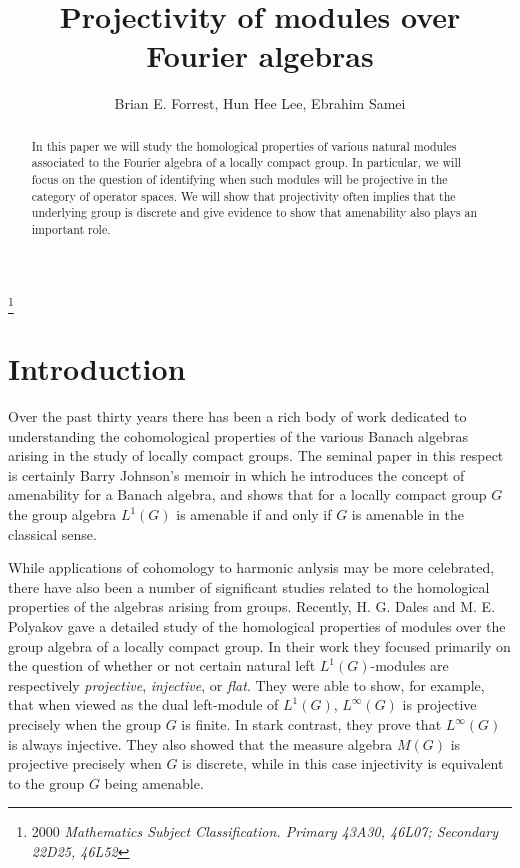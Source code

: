 \documentclass[10pt]{amsart}
\numberwithin{thm}{section}
\numberwithin{equation}{section}
\begin{document}
\title{Projectivity of modules over Fourier algebras}
\author{Brian E. Forrest, Hun Hee Lee, Ebrahim Samei}

\address{Brian E. Forrest: Department of Pure Mathematics, Faculty of Mathematics, University of Waterloo,
200 University Avenue West, Waterloo, Ontario, Canada N2L 3G1}
\address{Hun Hee Lee: Department of Mathematics, Chungbuk National University, 410 Sungbong-Ro, Heungduk-Gu, Cheongju 361-763, Korea}
\address{Ebrahim Samei: Department of Mathematics and Statistics, University of Saskatchewan, 106 Wiggins Road Saskatoon, SK S7N 5E6 CANADA}
\thanks{2000 \it{Mathematics Subject Classification}.
\rm{Primary 43A30, 46L07; Secondary 22D25, 46L52}}

\begin{abstract}
In this paper we will study the homological properties of various natural modules associated
to the Fourier algebra of a locally compact group. In particular, we will focus on the question of 
identifying when such modules will be projective in the category of operator spaces.
We will show that projectivity often implies that the underlying group is discrete and give evidence
to show that amenability also plays an important role.
\end{abstract}

\maketitle

\section{Introduction}
Over the past thirty years there has been a rich body of work dedicated to understanding the 
cohomological properties of the various Banach algebras arising in the study of locally compact 
groups. The seminal paper in this respect is certainly Barry Johnson's memoir \cite{John} in which he introduces
the concept of amenability for a Banach algebra, and shows that for a locally compact group 
$G$ the group algebra $L^{1}(G)$ is amenable if and only if $G$ is amenable in the classical 
sense. 

While applications of cohomology to harmonic anlysis may be more celebrated, there have also been
a number of significant studies related to the homological properties of the algebras arising 
from groups. Recently, H. G. Dales and M. E. Polyakov \cite{DP04} gave a detailed study of the homological 
properties of modules over the group algebra of a locally compact group. In their work
they focused primarily on the question of whether or not certain natural left $L^1(G)$-modules are respectively 
\textit{projective}, \textit{injective}, or \textit{flat}. They were able to show, for example, that 
when viewed as the dual left-module of $L^{1}(G)$, $L^{\infty}(G)$ is projective precisely when the 
group $G$ is finite. In stark contrast, they prove that $L^{\infty}(G)$  is always injective. They also showed that the measure algebra $M(G)$
is projective precisely when $G$ is discrete, while in this case injectivity is equivalent to the group $G$ being 
amenable. 
\end{document}
